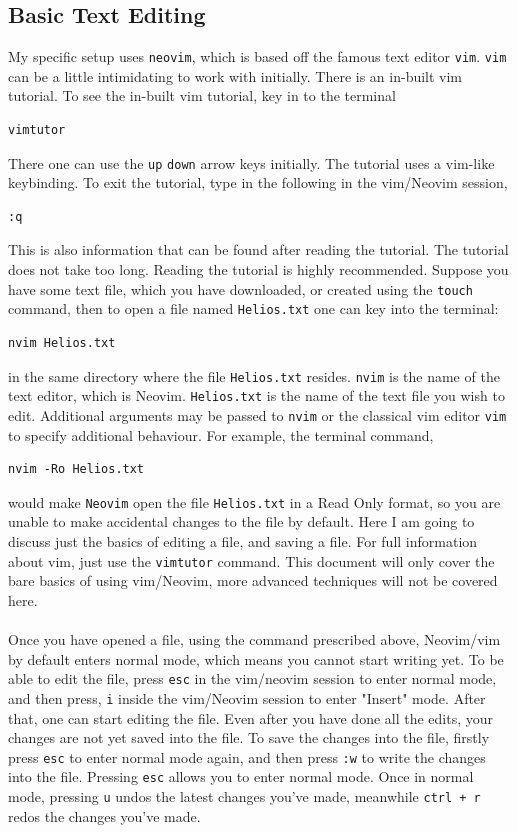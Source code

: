 \documentclass[a4paper, 12pt]{report}
\begin{document}
\begin{center}
\subsection{Basic Text Editing}

My specific setup uses \texttt{neovim}, which is based off the famous text editor \texttt{vim}. \texttt{vim} can be a little intimidating to work with initially. There is an in-built vim tutorial. To see the in-built vim tutorial, key in to the terminal
\begin{lstlisting}
vimtutor
\end{lstlisting}
There one can use the \texttt{up} \texttt{down} arrow keys initially. The tutorial uses a vim-like keybinding. To exit the tutorial, type in the following in the vim/Neovim session,
\begin{lstlisting}
:q
\end{lstlisting}
This is also information that can be found after reading the tutorial. The tutorial does not take too long. Reading the tutorial is highly recommended. Suppose you have some text file, which you have downloaded, or created using the \texttt{touch} command, then to open a file named \texttt{Helios.txt} one can key into the terminal:
\begin{lstlisting}
nvim Helios.txt
\end{lstlisting}
in the same directory where the file \texttt{Helios.txt} resides. \texttt{nvim} is the name of the text editor, which is Neovim. \texttt{Helios.txt} is the name of the text file you wish to edit. Additional arguments may be passed to \texttt{nvim} or the classical vim editor \texttt{vim} to specify additional behaviour. For example, the terminal command,
\begin{lstlisting}
nvim -Ro Helios.txt
\end{lstlisting}
would make \texttt{Neovim} open the file \texttt{Helios.txt} in a Read Only format, so you are unable to make accidental changes to the file by default. Here I am going to discuss just the basics of editing a file, and saving a file. For full information about vim, just use the \texttt{vimtutor} command. This document will only cover the bare basics of using vim/Neovim, more advanced techniques will not be covered here. 
\\~\\Once you have opened a file, using the command prescribed above, Neovim/vim by default enters normal mode, which means you cannot start writing yet. To be able to edit the file, press \texttt{esc} in the vim/neovim session to enter normal mode, and then press, \texttt{i} inside the vim/Neovim session to enter "Insert" mode. After that, one can start editing the file. Even after you have done all the edits, your changes are not yet saved into the file. To save the changes into the file, firstly  press \texttt{esc} to enter normal mode again, and then press \texttt{:w} to write the changes into the file. Pressing \texttt{esc} allows you to enter normal mode. Once in normal mode, pressing \texttt{u} undos the latest changes you've made, meanwhile \texttt{ctrl + r} redos the changes you've made. 

\end{center}
\end{document}
